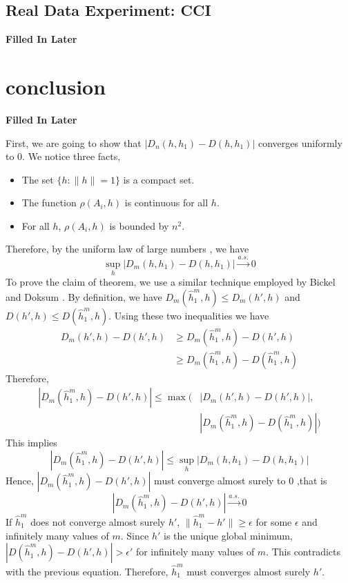 \documentclass[10pt,journal,compsoc]{IEEEtran}
\newenvironment{proof}[1][Proof]{\begin{trivlist}
		\item[\hskip \labelsep {\bfseries #1}]}{\end{trivlist}}
\begin{document}
\subsection{Real Data Experiment: CCI}
{\bf Filled In Later}

\section{conclusion}
{\bf Filled In Later}


\appendix
\begin{proof} [Proof of Theorem 4.1]
First,  we are going to show that $|D_n(h,h_1)-D(h,h_1)|$ converges uniformly to $0$.
We notice three facts,
\begin{itemize}
	\item[(1)] The set $\{h: \|h\|=1\}$ is a compact set.
	\item[(2)] The function $\rho(A_i,h)$ is continuous for all $h$.
	\item[(3)] For all $h$, $\rho(A_i,h)$ is bounded by $n^2$.
\end{itemize}
Therefore, by the uniform law of large numbers \cite{jennrich1969asymptotic}, we have
\[\underset{h}{\sup}|D_m(h,h_1)-D(h,h_1)|\overset{a.s.}{\rightarrow} 0\]
To prove the claim of theorem, we use a similar technique employed by Bickel and Doksum \cite{bickel2015mathematical}. By definition, we have $D_m(\hat{h}_1^m,h)  \leq D_m(h',h)$ and $D(h',h) \leq D(\hat{h}_1^m,h)$. Using these two inequalities we have
\begin{align*}
D_m(h',h)-D(h',h) &\geq D_m(\hat{h}_1^m,h)-D(h',h) \\
&\geq D_m(\hat{h}_1^m,h)-D(\hat{h}_1^m,h) 
\end{align*}
Therefore, 
\begin{align*}
|D_m(\hat{h}_1^m,h)-D(h',h)|  \leq  \max(&|D_m(h',h)-D(h',h)|,\\
& |D_m(\hat{h}_1^m,h)-D(\hat{h}_1^m,h)|)
\end{align*}
This implies 
\[ |D_m(\hat{h}_1^m,h)-D(h',h)| \leq \underset{h}{\sup}|D_m(h,h_1)-D(h,h_1)| \]
Hence, $|D_m(\hat{h}_1^m,h)-D(h',h)|$ must converge almost surely to $0$ ,that is
\[|D_m(\hat{h}_1^m,h)-D(h',h)|\overset{a.s.}{\rightarrow} 0 \]
 If $\hat{h}_1^m$ does not converge almost surely $h'$, $\|\hat{h}_1^m-h'\|\geq \epsilon$ for some $\epsilon$ and infinitely many values of $m$. Since $h'$ is the unique global minimum, $|D(\hat{h}_1^m,h)-D(h',h)| > \epsilon' $ for infinitely many values of $m$. This contradicts with the previous equation. Therefore, $\hat{h}_1^m$ must converges almost surely $h'$.
	
\end{proof}
\end{document}
